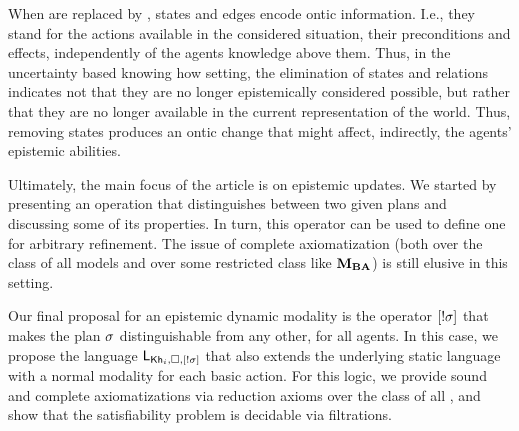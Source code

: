 \begin{mrevised}
When  are replaced by , states and edges encode ontic information.  I.e., they stand for the actions available in the considered situation, their preconditions and effects, independently of the agents knowledge above them.  
%
%
Thus, in the uncertainty based knowing how setting, the elimination of states and relations indicates not that they are no longer epistemically considered possible, but rather that they are no longer available in the current representation of the world. 
Thus, removing states produces an ontic change that might affect,
indirectly, the agents’ epistemic abilities. 


Ultimately, the main focus of the article is on epistemic updates.  We started by presenting an operation that distinguishes between two given plans and discussing some of its properties. In turn, this operator can be used to define one for arbitrary refinement. The issue of complete axiomatization (both over the class of all models and over some restricted class like $\mathbf{M}_{\mathbf{BA}}$) is still elusive in this setting. 

Our final proposal for an epistemic dynamic modality is the operator $[!\sigma]$ that makes the plan $\sigma$ distinguishable from any other, for all agents. In this case, we propose the language $\mathsf{L}_{{\sf Kh}_i,\square,[!\sigma]}$ that also extends the underlying static language with a normal modality for each basic action. For this logic, we provide sound and complete axiomatizations via reduction axioms over the class of all , and show that the satisfiability problem is decidable via filtrations.  


\end{mrevised}
